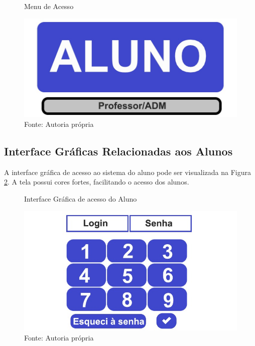 \documentclass{utfpr-pg}
\begin{document}
        \begin{figure}[H]
            \centering
            \captionsetup{width=0.9\textwidth}
            \caption{Menu de Acesso}
            \includegraphics[width=\linewidth]{fotos/1.jpg}
            \caption*{Fonte: Autoria própria}
            \label{fig:1}
        \end{figure}
        
    \subsection{Interface Gráficas Relacionadas aos Alunos}
       
        
        A interface gráfica de acesso ao sistema do aluno pode ser visualizada na Figura \ref{fig:2}. A tela possui cores fortes, facilitando o acesso dos alunos.
       
        \begin{figure}[H]
            \centering
            \captionsetup{width=0.9\textwidth}
            \caption{Interface Gráfica de acesso do Aluno}
            \includegraphics[width=\linewidth]{fotos/2.jpg}
            \caption*{Fonte: Autoria própria}
            \label{fig:2}
        \end{figure}
\end{document}
